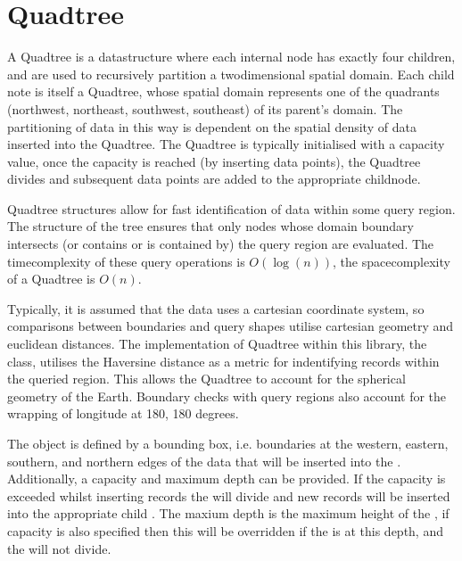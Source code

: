 \documentclass[letterpaper,10pt,english]{sphinxmanual}
\begin{document}
\sphinxstepscope


\chapter{Quadtree}
\label{\detokenize{quadtree:quadtree}}\label{\detokenize{quadtree::doc}}
\sphinxAtStartPar
A Quadtree is a data\sphinxhyphen{}structure where each internal node has exactly four children, and are used to recursively partition
a two\sphinxhyphen{}dimensional spatial domain. Each child note is itself a Quadtree, whose spatial domain represents one of the
quadrants (north\sphinxhyphen{}west, north\sphinxhyphen{}east, south\sphinxhyphen{}west, south\sphinxhyphen{}east) of its parent’s domain. The partitioning of data in this way
is dependent on the spatial density of data inserted into the Quadtree. The Quadtree is typically initialised with a
capacity value, once the capacity is reached (by inserting data points), the Quadtree divides and subsequent data points
are added to the appropriate child\sphinxhyphen{}node.

\sphinxAtStartPar
Quadtree structures allow for fast identification of data within some query region. The structure of the tree ensures
that only nodes whose domain boundary intersects (or contains or is contained by) the query region are evaluated. The
time\sphinxhyphen{}complexity of these query operations is \(O(\log(n))\), the space\sphinxhyphen{}complexity of a Quadtree is \(O(n)\).

\sphinxAtStartPar
Typically, it is assumed that the data uses a cartesian coordinate system, so comparisons between boundaries and query
shapes utilise cartesian geometry and euclidean distances. The implementation of Quadtree within this library, the
 class, utilises the Haversine distance as a metric for indentifying records within the queried region.
This allows the Quadtree to account for the spherical geometry of the Earth. Boundary checks with query regions also
account for the wrapping of longitude at \sphinxhyphen{}180, 180 degrees.

\sphinxAtStartPar
The  object is defined by a bounding box, i.e. boundaries at the western, eastern, southern, and northern edges of
the data that will be inserted into the . Additionally, a capacity and maximum depth can be provided. If the
capacity is exceeded whilst inserting records the  will divide and new records will be inserted into the appropriate
child . The maxium depth is the maximum height of the , if capacity is also specified then this will be
overridden if the  is at this depth, and the  will not divide.
\end{document}
